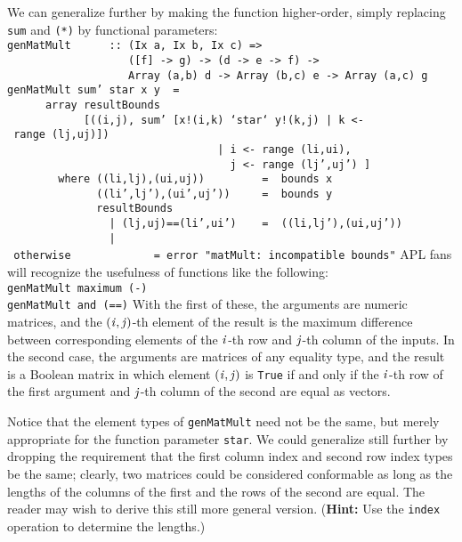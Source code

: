 We can generalize further by making the function higher-order,
simply replacing \mbox{\tt sum} and \mbox{\tt (*)} by functional parameters:
\bprog
\mbox{\tt genMatMult\ \ \ \ \ \ ::\ (Ix\ a,\ Ix\ b,\ Ix\ c)\ =>}\\
\mbox{\tt \ \ \ \ \ \ \ \ \ \ \ \ \ \ \ \ \ \ \ ([f]\ ->\ g)\ ->\ (d\ ->\ e\ ->\ f)\ ->}\\
\mbox{\tt \ \ \ \ \ \ \ \ \ \ \ \ \ \ \ \ \ \ \ Array\ (a,b)\ d\ ->\ Array\ (b,c)\ e\ ->\ Array\ (a,c)\ g}\\
\mbox{\tt genMatMult\ sum'\ star\ x\ y\ \ =}\\
\mbox{\tt \ \ \ \ \ \ array\ resultBounds}\\
\mbox{\tt \ \ \ \ \ \ \ \ \ \ \ \ [((i,j),\ sum'\ [x!(i,k)\ `star`\ y!(k,j)\ |\ k\ <-\ range\ (lj,uj)])}\\
\mbox{\tt \ \ \ \ \ \ \ \ \ \ \ \ \ \ \ \ \ \ \ \ \ \ \ \ \ \ \ \ \ \ \ \ \ |\ i\ <-\ range\ (li,ui),}\\
\mbox{\tt \ \ \ \ \ \ \ \ \ \ \ \ \ \ \ \ \ \ \ \ \ \ \ \ \ \ \ \ \ \ \ \ \ \ \ j\ <-\ range\ (lj',uj')\ ]}\\
\mbox{\tt \ \ \ \ \ \ \ \ where\ ((li,lj),(ui,uj))\ \ \ \ \ \ \ \ \ =\ \ bounds\ x}\\
\mbox{\tt \ \ \ \ \ \ \ \ \ \ \ \ \ \ ((li',lj'),(ui',uj'))\ \ \ \ \ =\ \ bounds\ y}\\
\mbox{\tt \ \ \ \ \ \ \ \ \ \ \ \ \ \ resultBounds}\\
\mbox{\tt \ \ \ \ \ \ \ \ \ \ \ \ \ \ \ \ |\ (lj,uj)==(li',ui')\ \ \ \ =\ \ ((li,lj'),(ui,uj'))}\\
\mbox{\tt \ \ \ \ \ \ \ \ \ \ \ \ \ \ \ \ |\ otherwise\ \ \ \ \ \ \ \ \ \ \ \ \ =\ error\ "matMult:\ incompatible\ bounds"}
\eprog
APL fans will recognize the usefulness of functions like the following:
\bprog
\mbox{\tt genMatMult\ maximum\ (-)}\\
\mbox{\tt genMatMult\ and\ (==)}
\eprog
With the first of these, the arguments are numeric matrices, and the
\mbox{$\it (i,j)$}-th element of the result is the maximum difference between
corresponding elements of the \mbox{$\it i$}-th row and \mbox{$\it j$}-th column of the
inputs.  In the second case, the arguments are matrices of any equality
type, and the result is a Boolean matrix in which element \mbox{$\it (i,j)$}
is \mbox{\tt True} if and only if the \mbox{$\it i$}-th row of the first argument and
\mbox{$\it j$}-th column of the second are equal as vectors.

Notice that the element types of \mbox{\tt genMatMult} need not be the same,
but merely appropriate for the function parameter \mbox{\tt star}.  We could
generalize still further by dropping the requirement that the first
column index and second row index types be the same; clearly, two
matrices could be considered conformable as long as the lengths
of the columns of the first and the rows of the second are equal.
The reader may wish to derive this still more general version.
({\bf Hint:}  Use the \mbox{\tt index} operation to determine the lengths.)


